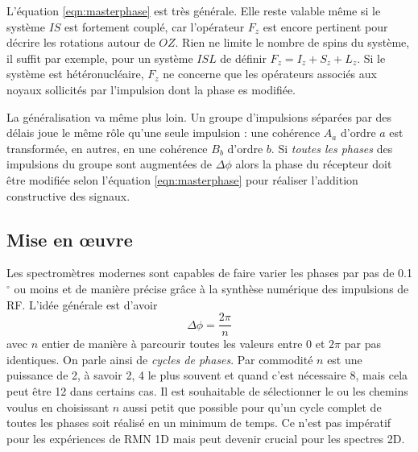 L'équation \ref{eqn:masterphase} est très générale.
Elle reste valable même si le système $IS$ est fortement couplé, car l'opérateur
$F_z$ est encore pertinent pour décrire les rotations autour de $OZ$.
Rien ne limite le nombre de spins du système, il suffit par exemple, pour un système
$ISL$ de définir $F_z = I_z + S_z + L_z$.
Si le système est hétéronucléaire, $F_z$ ne concerne que les opérateurs
associés aux noyaux sollicités par l'impulsion dont la phase es modifiée.

La généralisation va même plus loin.
Un groupe d'impulsions séparées par des délais joue le même
rôle qu'une seule impulsion : une cohérence $A_a$ d'ordre $a$ est
transformée, en autres, en une cohérence $B_b$ d'ordre $b$.
Si \emph{toutes les phases} des impulsions du groupe sont augmentées
de $\Delta\phi$ alors la phase du récepteur doit être modifiée selon
l'équation \ref{eqn:masterphase} pour réaliser l'addition constructive des signaux.

\subsection{Mise en {\oe}uvre}

Les spectromètres modernes sont capables de faire varier les phases
par pas de 0.1$^{\circ}$ ou moins et de manière précise grâce
à la synthèse numérique des impulsions de RF.
L'idée générale est d'avoir
\begin{equation}
\Delta\phi = \frac{2\pi}{n}
\end{equation}
avec $n$ entier de manière à parcourir toutes les valeurs entre
$0$ et $2\pi$ par pas identiques.
On parle ainsi de \emph{cycles de phases}.
Par commodité $n$ est une puissance de 2, à savoir 2, 4 le plus souvent et
quand c'est nécessaire 8, mais cela peut être 12 dans certains cas.
Il est souhaitable de sélectionner le ou les chemins voulus
en choisissant $n$ aussi petit que possible pour qu'un cycle
complet de toutes les phases soit réalisé en un minimum de temps.
Ce n'est pas impératif pour les expériences de RMN 1D
mais peut devenir crucial pour les spectres 2D.

